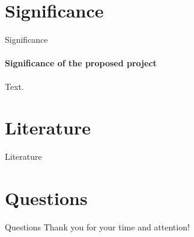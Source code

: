 \documentclass{beamer}
\begin{document}
\section{Significance}
\begin{frame}[allowframebreaks]{Significance}
  \framesubtitle{Significance of the proposed project}
    Text.
\end{frame}

\section*{Literature}
\begin{frame}[allowframebreaks]{Literature}
\scriptsize


\nocite{Eichenberger_2022}
\nocite{Fang_2020}
\nocite{Haddad_2017}
\nocite{Kibble1976}
\nocite{Stock_2023}
\nocite{Xu_2016}
\end{frame}

\section*{Questions}
\begin{frame}[allowframebreaks]{Questions}
Thank you for your time and attention!
\end{frame}

\appendix
\end{document}
